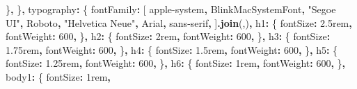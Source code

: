 \documentclass[
]{article}
\newenvironment{Shaded}{\begin{snugshade}}{\end{snugshade}}
\newcommand{\DecValTok}[1]{\textcolor[rgb]{0.00,0.00,0.81}{#1}}
\newcommand{\FunctionTok}[1]{\textcolor[rgb]{0.13,0.29,0.53}{\textbf{#1}}}
\newcommand{\NormalTok}[1]{#1}
\newcommand{\OperatorTok}[1]{\textcolor[rgb]{0.81,0.36,0.00}{\textbf{#1}}}
\newcommand{\StringTok}[1]{\textcolor[rgb]{0.31,0.60,0.02}{#1}}
\begin{document}
\begin{Shaded}
\begin{Highlighting}[]
\NormalTok{    \}}\OperatorTok{,}
\NormalTok{  \}}\OperatorTok{,}
\NormalTok{  typography}\OperatorTok{:}\NormalTok{ \{}
\NormalTok{    fontFamily}\OperatorTok{:}\NormalTok{ [}
      \StringTok{\textquotesingle{}{-}apple{-}system\textquotesingle{}}\OperatorTok{,}
      \StringTok{\textquotesingle{}BlinkMacSystemFont\textquotesingle{}}\OperatorTok{,}
      \StringTok{\textquotesingle{}"Segoe UI"\textquotesingle{}}\OperatorTok{,}
      \StringTok{\textquotesingle{}Roboto\textquotesingle{}}\OperatorTok{,}
      \StringTok{\textquotesingle{}"Helvetica Neue"\textquotesingle{}}\OperatorTok{,}
      \StringTok{\textquotesingle{}Arial\textquotesingle{}}\OperatorTok{,}
      \StringTok{\textquotesingle{}sans{-}serif\textquotesingle{}}\OperatorTok{,}
\NormalTok{    ]}\OperatorTok{.}\FunctionTok{join}\NormalTok{(}\StringTok{\textquotesingle{},\textquotesingle{}}\NormalTok{)}\OperatorTok{,}
\NormalTok{    h1}\OperatorTok{:}\NormalTok{ \{}
\NormalTok{      fontSize}\OperatorTok{:} \StringTok{\textquotesingle{}2.5rem\textquotesingle{}}\OperatorTok{,}
\NormalTok{      fontWeight}\OperatorTok{:} \DecValTok{600}\OperatorTok{,}
\NormalTok{    \}}\OperatorTok{,}
\NormalTok{    h2}\OperatorTok{:}\NormalTok{ \{}
\NormalTok{      fontSize}\OperatorTok{:} \StringTok{\textquotesingle{}2rem\textquotesingle{}}\OperatorTok{,}
\NormalTok{      fontWeight}\OperatorTok{:} \DecValTok{600}\OperatorTok{,}
\NormalTok{    \}}\OperatorTok{,}
\NormalTok{    h3}\OperatorTok{:}\NormalTok{ \{}
\NormalTok{      fontSize}\OperatorTok{:} \StringTok{\textquotesingle{}1.75rem\textquotesingle{}}\OperatorTok{,}
\NormalTok{      fontWeight}\OperatorTok{:} \DecValTok{600}\OperatorTok{,}
\NormalTok{    \}}\OperatorTok{,}
\NormalTok{    h4}\OperatorTok{:}\NormalTok{ \{}
\NormalTok{      fontSize}\OperatorTok{:} \StringTok{\textquotesingle{}1.5rem\textquotesingle{}}\OperatorTok{,}
\NormalTok{      fontWeight}\OperatorTok{:} \DecValTok{600}\OperatorTok{,}
\NormalTok{    \}}\OperatorTok{,}
\NormalTok{    h5}\OperatorTok{:}\NormalTok{ \{}
\NormalTok{      fontSize}\OperatorTok{:} \StringTok{\textquotesingle{}1.25rem\textquotesingle{}}\OperatorTok{,}
\NormalTok{      fontWeight}\OperatorTok{:} \DecValTok{600}\OperatorTok{,}
\NormalTok{    \}}\OperatorTok{,}
\NormalTok{    h6}\OperatorTok{:}\NormalTok{ \{}
\NormalTok{      fontSize}\OperatorTok{:} \StringTok{\textquotesingle{}1rem\textquotesingle{}}\OperatorTok{,}
\NormalTok{      fontWeight}\OperatorTok{:} \DecValTok{600}\OperatorTok{,}
\NormalTok{    \}}\OperatorTok{,}
\NormalTok{    body1}\OperatorTok{:}\NormalTok{ \{}
\NormalTok{      fontSize}\OperatorTok{:} \StringTok{\textquotesingle{}1rem\textquotesingle{}}\OperatorTok{,}

\end{Highlighting}
\end{Shaded}
\end{document}
